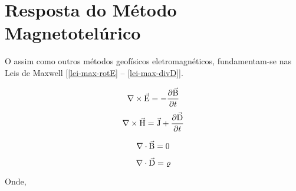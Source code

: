         
        


        
    \section{Resposta do Método Magnetotelúrico}

        O \mt{} assim como outros métodos geofísicos eletromagnéticos, fundamentam-se nas Leis de Maxwell [\ref{lei-max-rotE} -- \ref{lei-max-divD}].
        
        \begin{equation}
            \label{lei-max-rotE}
            \nabla \times \vec{\textrm{E}} = - \dfrac{\partial \vec{\textrm{B}}}{\partial t}
        \end{equation}
        \begin{equation}
            \label{lei-max-rotH}
            \nabla \times \vec{\textrm{H}} = \vec{\textrm{J}} + \dfrac{\partial \vec{\textrm{D}}}{\partial t}
        \end{equation}

        \begin{equation}
            \label{lei-max-divB}
            \nabla \cdot \vec{\textrm{B}} = 0 
        \end{equation}

        \begin{equation}
            \label{lei-max-divD}
            \nabla \cdot \vec{\textrm{D}} = \varrho                
        \end{equation}
        
        \noindent Onde,
            
